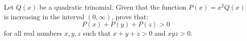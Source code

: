 Let $Q(x)$ be a quadratic trinomial. Given that the function $P(x)=x^{2}Q(x)$ is increasing in the interval $(0,\infty )$, prove that:
\[P(x) + P(y) + P(z) > 0\]
for all real numbers $x,y,z$ such that $x+y+z>0$ and $xyz>0$.